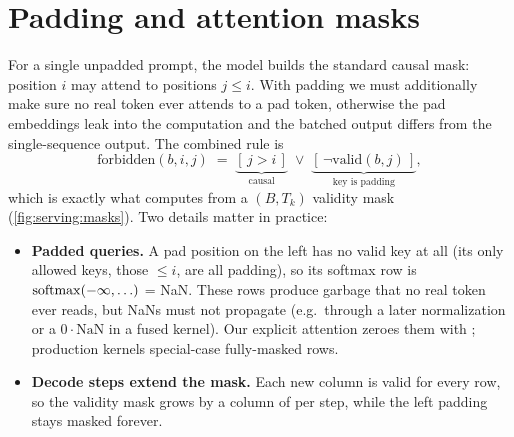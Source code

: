 \section{Padding and attention masks}\label{sec:serving:masks}

For a single unpadded prompt, the model builds the standard causal mask: position $i$ may attend
to positions $j\le i$. With padding we must additionally make sure no real token ever attends to a
pad token, otherwise the pad embeddings leak into the computation and the batched output differs
from the single-sequence output. The combined rule is
\begin{equation}\label{eq:serving:mask}
  \text{forbidden}(b,i,j) \;=\; \underbrace{[\,j>i\,]}_{\text{causal}} \;\lor\; \underbrace{[\,\neg\text{valid}(b,j)\,]}_{\text{key is padding}},
\end{equation}
which is exactly what  computes from a $(B,T_k)$ validity mask
(\cref{fig:serving:masks}). Two details matter in practice:
\begin{itemize}
  \item \textbf{Padded queries.} A pad position on the left has no valid key at all (its only
    allowed keys, those $\le i$, are all padding), so its softmax row is $\operatorname{softmax}(-\infty,\ldots)$ =
    NaN. These rows produce garbage that no real token ever reads, but NaNs must not propagate
    (e.g.\ through a later normalization or a $0\cdot\text{NaN}$ in a fused kernel). Our explicit attention
    zeroes them with ; production kernels special-case fully-masked rows.
  \item \textbf{Decode steps extend the mask.} Each new column is valid for every row, so the
    validity mask grows by a column of  per step, while the left padding stays masked
    forever.
\end{itemize}

